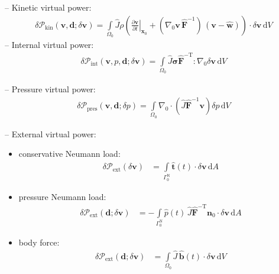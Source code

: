 \documentclass[a4paper,12pt]{report}
\newcommand{\Om}{\mathit{\Omega}}
\newcommand{\Gm}{\mathit{\Gamma}}
\begin{document}
-- Kinetic virtual power:
\begin{equation}
\begin{aligned}
\delta \mathcal{P}_{\mathrm{kin}}(\boldsymbol{v},\boldsymbol{d};\delta\boldsymbol{v}) = \int\limits_{\Om_0} \widehat{J} \rho\left(\left.\frac{\partial\boldsymbol{v}}{\partial t}\right|_{\boldsymbol{x}_{0}} + (\nabla_{0}\boldsymbol{v}\,\widehat{\boldsymbol{F}}^{-1})\,(\boldsymbol{v}-\widehat{\boldsymbol{w}})\right) \cdot \delta\boldsymbol{v} \,\mathrm{d}V
\end{aligned}
\end{equation}
-- Internal virtual power:
\begin{equation}
\begin{aligned}
\delta \mathcal{P}_{\mathrm{int}}(\boldsymbol{v},p,\boldsymbol{d};\delta\boldsymbol{v}) = 
\int\limits_{\Om_0} \widehat{J}\boldsymbol{\sigma}\widehat{\boldsymbol{F}}^{-\mathrm{T}} : \nabla_{0} \delta\boldsymbol{v} \,\mathrm{d}V
\end{aligned}
\end{equation}

-- Pressure virtual power:
\begin{equation}
\begin{aligned}
\delta \mathcal{P}_{\mathrm{pres}}(\boldsymbol{v},\boldsymbol{d};\delta p) = 
\int\limits_{\Om_0} \nabla_{0}\cdot\left(\widehat{J}\widehat{\boldsymbol{F}}^{-1}\boldsymbol{v}\right) \delta p\,\mathrm{d}V
\end{aligned}
\end{equation}

-- External virtual power:\\
\begin{itemize}
\item conservative Neumann load:
\begin{equation}
\begin{aligned}
\delta \mathcal{P}_{\mathrm{ext}}(\delta\boldsymbol{v}) &= \int\limits_{\Gm_0^{\mathrm{N}}} \hat{\boldsymbol{t}}(t) \cdot \delta\boldsymbol{v} \,\mathrm{d}A
\end{aligned}
\end{equation}
\item pressure Neumann load:
\begin{equation}
\begin{aligned}
\delta \mathcal{P}_{\mathrm{ext}}(\boldsymbol{d};\delta\boldsymbol{v}) &= -\int\limits_{\Gm_0^{\mathrm{N}}} \hat{p}(t)\,\widehat{J}\widehat{\boldsymbol{F}}^{-\mathrm{T}}\boldsymbol{n}_{0} \cdot \delta\boldsymbol{v} \,\mathrm{d}A 
\end{aligned}
\end{equation}
\item body force:
\begin{equation}
\begin{aligned}
\delta \mathcal{P}_{\mathrm{ext}}(\boldsymbol{d};\delta\boldsymbol{v}) &= \int\limits_{\Om_0} \widehat{J}\,\hat{\boldsymbol{b}}(t) \cdot \delta\boldsymbol{v} \,\mathrm{d}V
\end{aligned}
\end{equation}
\end{itemize}
\end{document}
